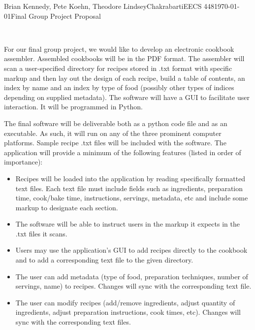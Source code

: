 \documentclass{article}
\begin{document}
\begin{mla}{Brian Kennedy, Pete Koehn, Theodore Lindsey}{}{Chakrabarti}{EECS 448}{\today}{Final Group Project Proposal}

\

For our final group project, we would like to develop an electronic cookbook assembler. Assembled cookbooks will be in the PDF format.  The assembler will scan a user-specified directory for recipes stored in .txt format with specific markup and then lay out the design of each recipe, build a table of contents, an index by name and an index by type of food (possibly other types of indices depending on supplied metadata).  The software will have a GUI to facilitate user interaction.  It will be programmed in Python.

The final software will be deliverable both as a python code file and as an executable.  As such, it will run on any of the three prominent computer platforms.  Sample recipe .txt files will be included with the software.  The application will provide a minimum of the following features (listed in order of importance):

\begin{itemize}
\item Recipes will be loaded into the application by reading specifically formatted text files. Each text file must include fields such as ingredients, preparation time, cook/bake time, instructions, servings, metadata, etc and include some markup to designate each section.

\item The software will be able to instruct users in the markup it expects in the .txt files it scans.

\item Users may use the application’s GUI to add recipes directly to the cookbook and to add a corresponding text file to the given directory.

\item The user can add metadata (type of food, preparation techniques, number of servings, name) to recipes.  Changes will sync with the corresponding text file.

\item The user can modify recipes (add/remove ingredients, adjust quantity of ingredients, adjust preparation instructions, cook times, etc).  Changes will sync with the corresponding text files.


\end{itemize}
\end{mla}
\end{document}
